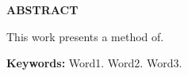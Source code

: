 \thispagestyle{plain}

\begin{center}
	\textbf{ABSTRACT}
\end{center}

\bigskip

This work presents a method of.

\textbf{Keywords:} Word1. Word2. Word3.